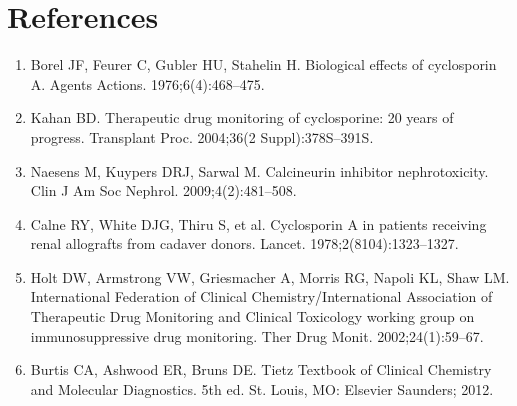 \section*{References}
\begin{enumerate}
  \item Borel JF, Feurer C, Gubler HU, Stahelin H. Biological effects of cyclosporin A. Agents Actions. 1976;6(4):468--475.
  \item Kahan BD. Therapeutic drug monitoring of cyclosporine: 20 years of progress. Transplant Proc. 2004;36(2 Suppl):378S--391S.
  \item Naesens M, Kuypers DRJ, Sarwal M. Calcineurin inhibitor nephrotoxicity. Clin J Am Soc Nephrol. 2009;4(2):481--508.
  \item Calne RY, White DJG, Thiru S, et al. Cyclosporin A in patients receiving renal allografts from cadaver donors. Lancet. 1978;2(8104):1323--1327.
  \item Holt DW, Armstrong VW, Griesmacher A, Morris RG, Napoli KL, Shaw LM. International Federation of Clinical Chemistry/International Association of Therapeutic Drug Monitoring and Clinical Toxicology working group on immunosuppressive drug monitoring. Ther Drug Monit. 2002;24(1):59--67.
  \item Burtis CA, Ashwood ER, Bruns DE. Tietz Textbook of Clinical Chemistry and Molecular Diagnostics. 5th ed. St. Louis, MO: Elsevier Saunders; 2012.
\end{enumerate}

\clearpage
